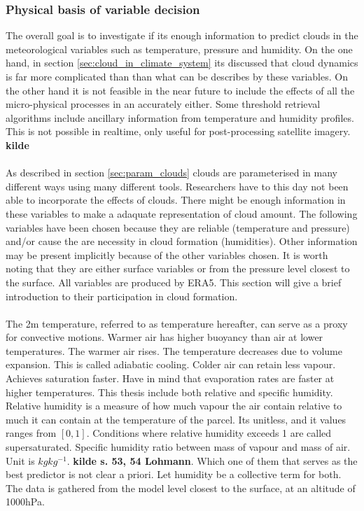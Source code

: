 \subsubsection{Physical basis of variable decision} \label{sec:physical_basis}
The overall goal is to investigate if its enough information to predict clouds in the meteorological variables such as temperature, pressure and humidity. On the one hand, in section \ref{sec:cloud_in_climate_system} its discussed that cloud dynamics is far more complicated than than what can be describes by these variables. On the other hand it is not feasible in the near future to include the effects of all the micro-physical processes in an accurately either. Some threshold retrieval algorithms include ancillary information from temperature and humidity profiles. This is not possible in realtime, only useful for post-processing satellite imagery. \textbf{kilde}
\\ \\
As described in section \ref{sec:param_clouds} clouds are parameterised in many different ways using many different tools. Researchers have to this day not been able to incorporate the effects of clouds. There might be enough information in these variables to make a adaquate representation of cloud amount. The following variables have been chosen because they are reliable (temperature and pressure) and/or cause the are necessity in cloud formation (humidities). Other information may be present implicitly because of the other variables chosen. It is worth noting that they are either surface variables or from the pressure level closest to the surface. All variables are produced by ERA5. This section will give a brief introduction to their participation in cloud formation. 
\\ \\
The 2m temperature, referred to as temperature hereafter, can serve as a proxy for convective motions. Warmer air has higher buoyancy than air at lower temperatures. The warmer air rises. The temperature decreases due to volume expansion. This is called adiabatic cooling. Colder air can retain less vapour. Achieves saturation faster. Have in mind that evaporation rates are faster at higher temperatures. This thesis include both relative and specific humidity. Relative humidity is a measure of how much vapour the air contain relative to much it can contain at the temperature of the parcel. Its unitless, and it values ranges from $\left[ 0, 1 \right]$.  Conditions where relative humidity exceeds 1 are called supersaturated. Specific humidity ratio between mass of vapour and mass of air. Unit is $kg kg^{-1}$. \textbf{kilde s. 53, 54 Lohmann}. Which one of them that serves as the best predictor is not clear a priori. Let humidity be a collective term for both. The data is gathered from the model level closest to the surface, at an altitude of 1000hPa. 

